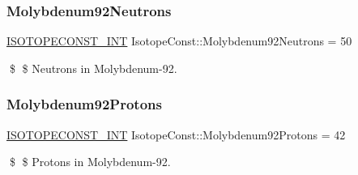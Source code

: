 \subsubsection{\texorpdfstring{Molybdenum92\+Neutrons}{Molybdenum92Neutrons}}
{\footnotesize\ttfamily \mbox{\hyperlink{group___isotope_const-_macros_ga5f18360b3e99483a35c32d789e62621c}{I\+S\+O\+T\+O\+P\+E\+C\+O\+N\+S\+T\+\_\+\+I\+NT}} Isotope\+Const\+::\+Molybdenum92\+Neutrons = 50}

\$ \$ Neutrons in Molybdenum-\/92. \mbox{\label{group___isotope_const-_molybdenum-_mo92_gad9072daf2b22ca33cbddd0ce6e265fd2}} 
\subsubsection{\texorpdfstring{Molybdenum92\+Protons}{Molybdenum92Protons}}
{\footnotesize\ttfamily \mbox{\hyperlink{group___isotope_const-_macros_ga5f18360b3e99483a35c32d789e62621c}{I\+S\+O\+T\+O\+P\+E\+C\+O\+N\+S\+T\+\_\+\+I\+NT}} Isotope\+Const\+::\+Molybdenum92\+Protons = 42}

\$ \$ Protons in Molybdenum-\/92. 